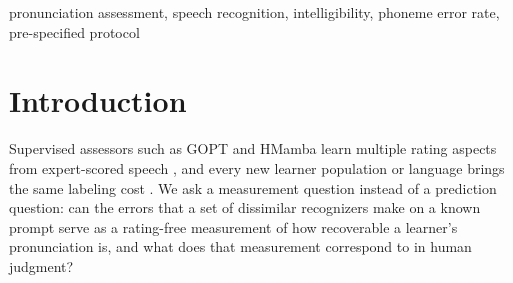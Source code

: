 \begin{abstract}
Pronunciation assessment depends on expert-scored speech. PAL, a Panel of Artificial Listeners, measures how recoverable a known
prompt is from a learner's reading with heterogeneous recognizers: each recognizer's phoneme error against the prompt is a
measurement, and the equal-weight mean over  recognizers admitted
by an a priori rule is the readout. No panel weight or score parameter is
fitted to human ratings; ratings serve only development and validation.
Design was fixed on the \so{} training split; five primary confirmatory comparisons were pre-specified and tested once
after protocol commitment.
PAL exceeds the best single
recognizer on the held-out test split ($\Delta r=\N{TestDelta}$
[, ]), is segmental rather than prosodic on ERJ, replicates on EpaDB, correlates
with human word recognition on ALLSSTAR ($r=\N{All}$), and tracks Mandarin tone above consonant ratings.
High-error recognizers retain most signal; none of the tested
aggregation rules beats the mean. The scale is relative; grades need anchors.
\end{abstract}
\begin{keywords}
pronunciation assessment, speech recognition, intelligibility, phoneme error rate, pre-specified protocol
\end{keywords}

\section{Introduction}
\label{sec:intro}
Supervised assessors such as GOPT and HMamba learn multiple rating
aspects from expert-scored speech \cite{gong2022,chao2025hmamba}, and every new learner population or language brings the same labeling
cost \cite{zhang2021speechocean}. We ask a measurement
question instead of a prediction question: can the errors that a set of
dissimilar recognizers make on a known prompt serve as a rating-free
measurement of how recoverable a learner's pronunciation is, and what does
that measurement correspond to in human judgment?

